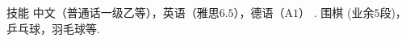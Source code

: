 
\begin{rubric}{技能}
\entry*[语言]
	中文（普通话一级乙等），英语（雅思$6.5$），德语（A$1$） .
\entry*[兴趣爱好]
	围棋 (业余$5$段)，乒乓球，羽毛球等.

\end{rubric}
